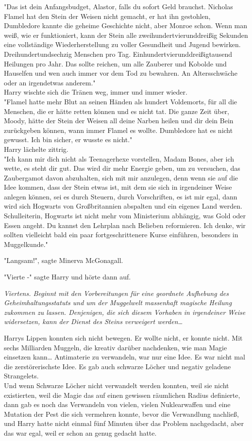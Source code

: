 {"Das ist dein Anfangsbudget, Alastor, falls du sofort Geld brauchst. Nicholas Flamel hat den Stein der Weisen nicht gemacht, er hat ihn gestohlen, Dumbledore kannte die geheime Geschichte nicht, aber Monroe schon. Wenn man weiß, wie er funktioniert, kann der Stein alle zweihundertvierunddreißig Sekunden eine vollständige Wiederherstellung zu voller Gesundheit und Jugend bewirken. Dreihundertundsechzig Menschen pro Tag. Einhundertvierunddreißigtausend Heilungen pro Jahr. Das sollte reichen, um alle Zauberer und Kobolde und Hauselfen und wen auch immer vor dem Tod zu bewahren. An Altersschwäche oder an irgendetwas anderem."\\ Harry wischte sich die Tränen weg, immer und immer wieder.\\ "Flamel hatte mehr Blut an seinen Händen als hundert Voldemorts, für all die Menschen, die er hätte retten können und es nicht tat. Die ganze Zeit über, Moody, hätte der Stein der Weisen all deine Narben heilen und dir dein Bein zurückgeben können, wann immer Flamel es wollte. Dumbledore hat es nicht gewusst. Ich bin sicher, er wusste es nicht."\\ Harry lächelte zittrig.\\ "Ich kann mir dich nicht als Teenagerhexe vorstellen, Madam Bones, aber ich wette, es steht dir gut. Das wird dir mehr Energie geben, um zu versuchen, das Zaubergamot davon abzuhalten, sich mit mir anzulegen, denn wenn sie auf die Idee kommen, dass der Stein etwas ist, mit dem sie sich in irgendeiner Weise anlegen können, sei es durch Steuern, durch Vorschriften, es ist mir egal, dann wird sich Hogwarts von Großbritannien abspalten und ein eigenes Land werden. Schulleiterin, Hogwarts ist nicht mehr vom Ministerium abhängig, was Gold oder Essen angeht. Du kannst den Lehrplan nach Belieben reformieren. Ich denke, wir sollten vielleicht bald ein paar fortgeschrittenere Kurse einführen, besonders in Muggelkunde."

"Langsam!", sagte Minerva McGonagall.

"Vierte -" sagte Harry und hörte dann auf.

\emph{Viertens. Beginnt mit den Vorbereitungen für eine geordnete Aufhebung des Geheimhaltungsstatuts und um der Muggelwelt massenhaft magische Heilung zukommen zu lassen. Denjenigen, die sich diesem Vorhaben in irgendeiner Weise widersetzen, kann der Dienst des Steins verweigert werden…}

Harrys Lippen konnten sich nicht bewegen. Er wollte nicht, er konnte nicht. Mit sechs Milliarden Muggeln, die kreativ darüber nachdenken, wie man Magie einsetzen kann… Antimaterie zu verwandeln, war nur eine Idee. Es war nicht mal die zerstörerischste Idee. Es gab auch schwarze Löcher und negativ geladene Strangelets.\\ Und wenn Schwarze Löcher nicht verwandelt werden konnten, weil sie nicht existierten, weil die Magie das auf einen gewissen räumlichen Radius definierte, dann gab es noch das Verwandeln von vielen, vielen Nuklearwaffen und eine Mutation der Pest die sich vermehren konnte, bevor die Verwandlung nachließ, und Harry hatte nicht einmal fünf Minuten über das Problem nachgedacht, aber das war egal, weil er schon an genug gedacht hatte.

}
